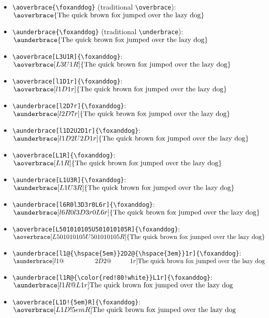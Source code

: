 \documentclass{ltxdockit}[2011/03/25]
\begin{document}
\newcommand{\foxanddog}{%
  \textrm{The quick brown fox jumped over the lazy dog}}
\begin{itemize}
  \item \lstinline!\aoverbrace{\foxanddog}! (traditional \lstinline!\overbrace!): \\ $\aoverbrace{\foxanddog}$
  \item \lstinline!\aunderbrace{\foxanddog}! (traditional \lstinline!\underbrace!): \\ $\aunderbrace{\foxanddog}$
  \item \lstinline!\aoverbrace[L3U1R]{\foxanddog}!: \\ $\aoverbrace[L3U1R]{\foxanddog}$
  \item \lstinline!\aoverbrace[l1D1r]{\foxanddog}!: \\ $\aoverbrace[l1D1r]{\foxanddog}$
  \item \lstinline!\aunderbrace[l2D7r]{\foxanddog}!: \\ $\aunderbrace[l2D7r]{\foxanddog}$
  \item \lstinline!\aunderbrace[l1D2U2D1r]{\foxanddog}!: \\ $\aunderbrace[l1D2U2D1r]{\foxanddog}$
  \item \lstinline!\aoverbrace[L1R]{\foxanddog}!: \\ $\aoverbrace[L1R]{\foxanddog}$
  \item \lstinline!\aunderbrace[L1U3R]{\foxanddog}!: \\ $\aunderbrace[L1U3R]{\foxanddog}$
  \item \lstinline!\aunderbrace[l6R0l3D3r0L6r]{\foxanddog}!: \\ $\aunderbrace[l6R0l3D3r0L6r]{\foxanddog}$
  \item \lstinline!\aoverbrace[L501010105U501010105R]{\foxanddog}!: \\ $\aoverbrace[L501010105U501010105R]{\foxanddog}$
  \item \lstinline!\aunderbrace[l1@{\hspace{5em}}2D2@{\hspace{3em}}1r]{\foxanddog}!: \\ $\aunderbrace[l1@{\hspace{5em}}2D2@{\hspace{3em}}1r]{\foxanddog}$
  \item \lstinline~\aunderbrace[l1R@{\color{red!80!white}}L1r]{\foxanddog}~: \\ $\aunderbrace[l1R@{\color{red!80!white}}L1r]{\foxanddog}$
  \item \lstinline~\aoverbrace[L1D!{5em}R]{\foxanddog}~: \\ $\aoverbrace[L1D!{5em}R]{\foxanddog}$
\end{itemize}
\end{document}
